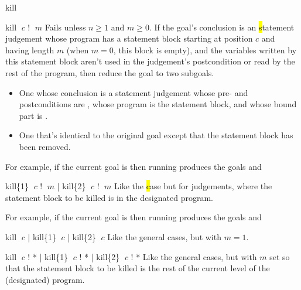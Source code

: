 \begin{tactic}{kill}
  \begin{tsyntax}{kill $\;c$ ! $\;m$}
    Fails unless $n\geq 1$ and $m\geq 0$.  If the goal's conclusion is
    an \hl statement judgement whose program has a statement block
    starting at position $c$ and having length $m$ (when $m = 0$, this
    block is empty), and the variables written by this statement block
    aren't used in the judgement's postcondition or read by the rest
    of the program, then reduce the goal to two subgoals.
    \begin{itemize}
    \item One whose conclusion is a \phl statement judgement whose pre-
       and postconditions are , whose program is the
       statement block, and whose bound part is .

    \item One that's identical to the original goal except that the
      statement block has been removed.
    \end{itemize}

    \medskip For example, if the current goal is
     then
    running 
    produces the goals
    and
  \end{tsyntax}

  \begin{tsyntax}{kill\{1\} $\;c$ ! $\;m$ | kill\{2\} $\;c$ ! $\;m$}
    Like the \hl case but for \prhl judgements, where the statement
    block to be killed is in the designated program.

    \medskip For example, if the current goal is
     then
    running 
    produces the goals
    and
  \end{tsyntax}

  \begin{tsyntax}{kill $\;c$ | kill\{1\} $\;c$ | kill\{2\} $\;c$}
    Like the general cases, but with $m = 1$.
  \end{tsyntax}

  \begin{tsyntax}{kill $\;c$ ! * | kill\{1\} $\;c$ ! * | kill\{2\} $\;c$ ! *}
    Like the general cases, but with $m$ set so that the statement
    block to be killed is the rest of the current level of the
    (designated) program.
  \end{tsyntax}
\end{tactic}
